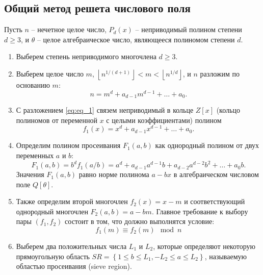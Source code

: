 \documentclass[a4paper,12pt]{article}
\begin{document}
\subsection{Общий метод решета числового поля}

Пусть $n$ -- нечетное целое число, $P_d(x)$ -- неприводимый полином степени $d \geq 3$, и
$\theta$ -- целое алгебраическое число, являющееся полиномом степени $d$.

\begin{enumerate}
    \item Выберем степень неприводимого многочлена $d \geq 3$.

    \item Выберем целое число $m$,
          $\left \lfloor n^{1/(d+1)} \right \rfloor < m < \left \lfloor n^{1/d} \right \rfloor$, и $n$ разложим по основанию $m$:
        \begin{equation} \label{eq:eq_1}
          n = m^d + a_{d-1}m^{d-1} + \ldots + a_0.
        \end{equation}

    \item С разложением \ref{eq:eq_1} связем неприводимый в кольце $Z[x]$
    (кольцо полиномов от переменной $x$ с целыми коэффициентами) полином
    \begin{equation} \label{eq:eq_2}
        f_1(x) = x^d + a_{d-1}x^{d-1} + \ldots + a_0.
    \end{equation}

    \item Определим полином просеивания $F_1(a, b)$ как однородный полином
    от двух переменных $a$ и $b$:
    \begin{equation} \label{eq:eq_3}
        F_1(a, b) = b^d f_1(a / b) = a^d + a_{d - 1}a^{d -1}b
        + a_{d - 2} a^{d-2}b^2 + \ldots + a_0b.
    \end{equation}
    Значения $F_1(a, b)$ равно норме полинома $a - bx$ в алгебраическом числовом
    поле $Q[\theta]$.

    \item Также определим второй многочлен $f_2(x) = x - m$ и соответствующий
    однородный многочлен $F_2(a, b) = a - bm$. Главное требование к выбору
    пары $(f_1, f_2)$ состоит в том, что должно выполнятся условие:
    \begin{equation} \label{eq:eq_4}
        f_1(m) \equiv f_2(m) \mod n
    \end{equation}

    \item Выберем два положительных числа $L_1$ и $L_2$, которые определяют некоторую
    прямоугольную область $SR = \left \{1 \leq b \leq L_1, -L_2 \leq a \leq L_2 \right \}$,
    называемую областью просеивания (sieve region).


\end{enumerate}
\end{document}
